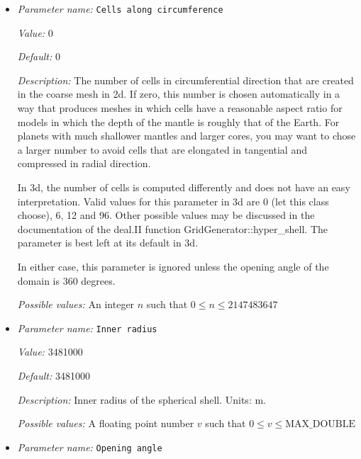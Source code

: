 \begin{itemize}
\item {\it Parameter name:} {\tt Cells along circumference}
\label{parameters:Geometry model/Spherical shell/Cells along circumference}
\label{parameters:Geometry_20model/Spherical_20shell/Cells_20along_20circumference}


{\it Value:} 0


{\it Default:} 0


{\it Description:} The number of cells in circumferential direction that are created in the coarse mesh in 2d. If zero, this number is chosen automatically in a way that produces meshes in which cells have a reasonable aspect ratio for models in which the depth of the mantle is roughly that of the Earth. For planets with much shallower mantles and larger cores, you may want to chose a larger number to avoid cells that are elongated in tangential and compressed in radial direction.

In 3d, the number of cells is computed differently and does not have an easy interpretation. Valid values for this parameter in 3d are 0 (let this class choose), 6, 12 and 96. Other possible values may be discussed in the documentation of the deal.II function GridGenerator::hyper_shell. The parameter is best left at its default in 3d.

In either case, this parameter is ignored unless the opening angle of the domain is 360 degrees.


{\it Possible values:} An integer $n$ such that $0\leq n \leq 2147483647$
\item {\it Parameter name:} {\tt Inner radius}
\label{parameters:Geometry model/Spherical shell/Inner radius}
\label{parameters:Geometry_20model/Spherical_20shell/Inner_20radius}


{\it Value:} 3481000


{\it Default:} 3481000


{\it Description:} Inner radius of the spherical shell. Units: m. 



{\it Possible values:} A floating point number $v$ such that $0 \leq v \leq \text{MAX\_DOUBLE}$
\item {\it Parameter name:} {\tt Opening angle}
\label{parameters:Geometry model/Spherical shell/Opening angle}
\label{parameters:Geometry_20model/Spherical_20shell/Opening_20angle}



\end{itemize}
